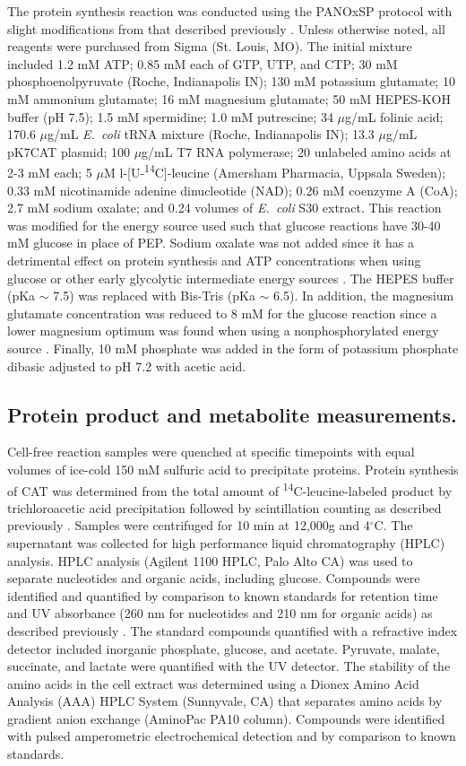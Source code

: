 \documentclass[journal=asbcd6,manuscript=article]{achemso}
\begin{document}
The protein synthesis reaction was conducted using the PANOxSP protocol with slight modifications from that described previously \cite{BIT:BIT20026}.
Unless otherwise noted, all reagents were purchased from Sigma (St. Louis, MO).
The initial mixture included 1.2 mM ATP; 0.85 mM each of GTP, UTP, and CTP; 30 mM phosphoenolpyruvate (Roche, Indianapolis IN); 130 mM potassium glutamate; 10 mM ammonium glutamate; 16 mM magnesium glutamate; 50 mM HEPES-KOH buffer (pH 7.5); 1.5 mM spermidine; 1.0 mM putrescine; 34 $\mu$g/mL folinic acid; 170.6 $\mu$g/mL \textit{E.~coli} tRNA mixture (Roche, Indianapolis IN); 13.3 $\mu$g/mL pK7CAT plasmid; 100 $\mu$g/mL T7 RNA polymerase; 20 unlabeled amino acids at 2-3 mM each; 5 $\mu$M l-[U-\textsuperscript{14}C]-leucine (Amersham Pharmacia, Uppsala Sweden); 0.33 mM nicotinamide adenine dinucleotide (NAD); 0.26 mM coenzyme A (CoA); 2.7 mM sodium oxalate; and 0.24 volumes of \textit{E.~coli} S30 extract.
This reaction was modified for the energy source used such that glucose reactions have 30-40 mM glucose in place of PEP.
Sodium oxalate was not added since it has a detrimental effect on protein synthesis and ATP concentrations when using glucose or other early glycolytic intermediate energy sources \cite{BIT:BIT1121}. The HEPES buffer (pKa $\sim$ 7.5) was replaced with Bis-Tris (pKa $\sim$ 6.5). In addition, the magnesium glutamate concentration was reduced to 8 mM for the glucose reaction since a lower magnesium optimum was found when using a nonphosphorylated energy source \cite{BIT:BIT20026}. Finally, 10 mM phosphate was added in the form of potassium phosphate dibasic adjusted to pH 7.2 with acetic acid.

\subsection*{Protein product and metabolite measurements.}
Cell-free reaction samples were quenched at specific timepoints with equal volumes of ice-cold 150 mM sulfuric acid to precipitate proteins.
Protein synthesis of CAT was determined from the total amount of \textsuperscript{14}C-leucine-labeled product by trichloroacetic acid precipitation followed by scintillation counting as described previously \cite{2005_calhoun_BiotechnologyProgress}.
Samples were centrifuged for 10 min at 12,000g and 4$^{\circ}$C.
The supernatant was collected for high performance liquid chromatography (HPLC) analysis.
HPLC analysis (Agilent 1100 HPLC, Palo Alto CA) was used to separate nucleotides and organic acids, including glucose. Compounds were identified and quantified by comparison to known standards for retention time and UV absorbance (260 nm for nucleotides and 210 nm for organic acids) as described previously \cite{2005_calhoun_BiotechnologyProgress}.
The standard compounds quantified with a refractive index detector included inorganic phosphate, glucose, and acetate.
Pyruvate, malate, succinate, and lactate were quantified with the UV detector.
The stability of the amino acids in the cell extract was determined using a Dionex Amino Acid Analysis (AAA) HPLC System (Sunnyvale, CA) that separates amino acids by gradient anion exchange (AminoPac PA10 column).
Compounds were identified with pulsed amperometric electrochemical detection and by comparison to known standards.
\end{document}
